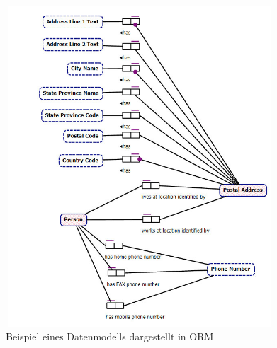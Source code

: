 \begin{figure}[!h]
	\begin{center}
		\includegraphics[width=10cm, height=12cm]{images/orm.jpg}
		\caption{Beispiel eines Datenmodells dargestellt in ORM}
		\label{orm}
	\end{center}
\end{figure}